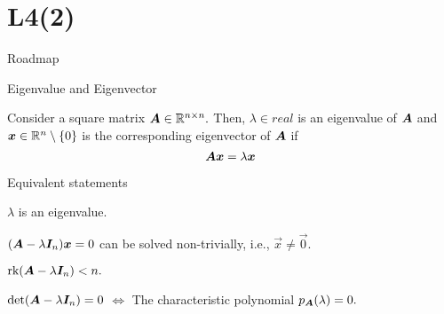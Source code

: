 \documentclass[handout,fleqn,aspectratio=169]{beamer}
\begin{document}
\section{L4(2)}
\begin{frame}{Roadmap}

\plitemsep 0.1in

\bce[(1)] 
\item {}

\item {}

\item {}

\ece
\end{frame}

\begin{frame}{Eigenvalue and Eigenvector}

\plitemsep 0.1in

\bci
\item {} Consider a square matrix $\bm{A} \in {\mathbb R}^{n \times n}.$ Then, $\lambda \in real$ is an eigenvalue of $\bm{A}$ and $\bm{x} \in {\mathbb R}^n \setminus \{0 \}$ is the corresponding eigenvector of $\bm{A}$ if 
$$
\bm{A} \bm{x} = \lambda \bm{x}
$$

\item Equivalent statements
\bci
\item $\lambda$ is an eigenvalue.
\item $(\bm{A} - \lambda \bm{I}_n)\bm{x}=0$ can be solved non-trivially, i.e., $\vec{x} \neq \vec{0}.$
\item $\text{rk}(\bm{A} - \lambda\bm{I}_n) < n.$
\item $\det(\bm{A} - \lambda\bm{I}_n) =0$ $\Longleftrightarrow$ The characteristic polynomial $p_{\bm{A}}(\lambda)=0.$
\eci
\eci
\end{frame}
\end{document}
